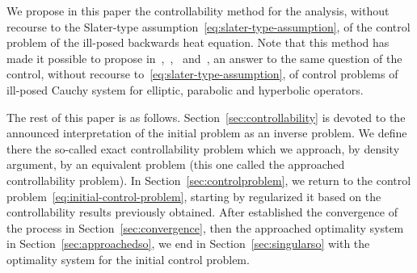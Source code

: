 We propose in this paper the controllability method for the analysis,
without recourse to the Slater-type
assumption~\eqref{eq:slater-type-assumption}, of the control problem of the
ill-posed backwards heat equation. Note that this method has made it
possible to propose
in~\cite{ownElliptic},~\cite{ownAAA},~\cite{ownParabolic}
and~\cite{ownhyperbolic}, an answer to the same question of the control,
without recourse to~\eqref{eq:slater-type-assumption}, of control problems
of ill-posed Cauchy system for elliptic, parabolic and hyperbolic
operators.

The rest of this paper is as follows. Section~\ref{sec:controllability}
is devoted to the announced interpretation of the initial problem as an
inverse problem. We define there the so-called exact controllability
problem which we approach, by density argument, by an equivalent problem
(this one called the approached controllability problem). In
Section~\ref{sec:controlproblem}, we return to the control
problem~\eqref{eq:initial-control-problem}, starting by regularized it
based on the controllability results previously obtained. After established
the convergence of the process in Section~\ref{sec:convergence}, then the
approached optimality system in Section~\ref{sec:approachedso}, we end in
Section~\ref{sec:singularso} with the optimality system for the initial
control problem.
